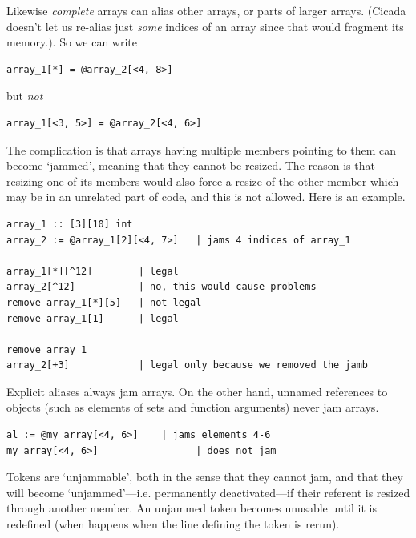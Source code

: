 \documentclass{article}
\newenvironment{code}{
       \begin{list}{}{
               \setlength{\leftmargin}{.4in}
               \setlength{\rightmargin}{0in}
               \setlength{\topsep}{.2in}
       }
       \small
       \item[] }
       { \end{list}   }
\begin{document}
\noindent Likewise \emph{complete} arrays can alias other arrays, or parts of larger arrays.  (Cicada doesn't let us re-alias just \emph{some} indices of an array since that would fragment its memory.).  So we can write

\begin{code} \begin{verbatim}
array_1[*] = @array_2[<4, 8>]
\end{verbatim} \end{code}

\noindent but \emph{not}

\begin{code} \begin{verbatim}
array_1[<3, 5>] = @array_2[<4, 6>]
\end{verbatim} \end{code}

The complication is that arrays having multiple members pointing to them can become `jammed', meaning that they cannot be resized.  The reason is that resizing one of its members would also force a resize of the other member which may be in an unrelated part of code, and this is not allowed.  Here is an example.

\begin{code} \begin{verbatim}
array_1 :: [3][10] int
array_2 := @array_1[2][<4, 7>]   | jams 4 indices of array_1

array_1[*][^12]        | legal
array_2[^12]           | no, this would cause problems
remove array_1[*][5]   | not legal
remove array_1[1]      | legal

remove array_1
array_2[+3]            | legal only because we removed the jamb
\end{verbatim} \end{code}

Explicit aliases always jam arrays.  On the other hand, unnamed references to objects (such as elements of sets and function arguments) never jam arrays.

\begin{code} \begin{verbatim}
al := @my_array[<4, 6>]    | jams elements 4-6
my_array[<4, 6>]                 | does not jam
\end{verbatim} \end{code}

\noindent Tokens are `unjammable', both in the sense that they cannot jam, and that they will become `unjammed'---i.e. permanently deactivated---if their referent is resized through another member.  An unjammed token becomes unusable until it is redefined (when happens when the line defining the token is rerun).
\end{document}
